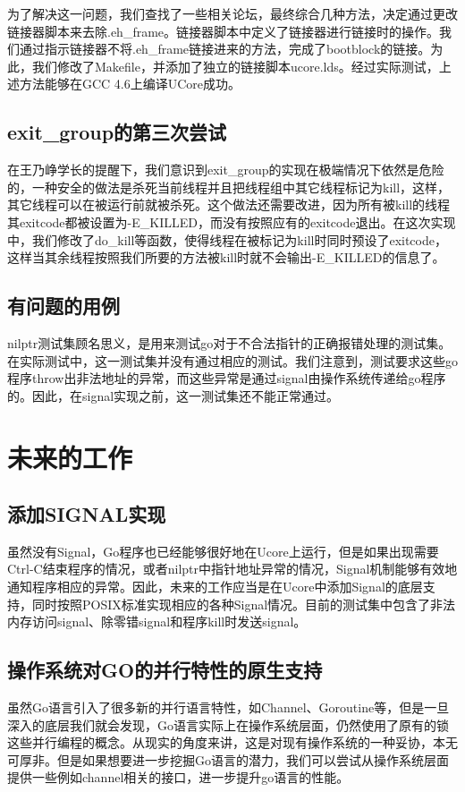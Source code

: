 \documentclass{article}
\begin{document}
为了解决这一问题，我们查找了一些相关论坛，最终综合几种方法，决定通过更改链接器脚本来去除.eh\_frame。链接器脚本中定义了链接器进行链接时的操作。我们通过指示链接器不将.eh\_frame链接进来的方法，完成了bootblock的链接。为此，我们修改了Makefile，并添加了独立的链接脚本ucore.lds。经过实际测试，上述方法能够在GCC 4.6上编译UCore成功。

\subsection{exit\_group的第三次尝试}
在王乃峥学长的提醒下，我们意识到exit\_group的实现在极端情况下依然是危险的，一种安全的做法是杀死当前线程并且把线程组中其它线程标记为kill，这样，其它线程可以在被运行前就被杀死。这个做法还需要改进，因为所有被kill的线程其exitcode都被设置为-E\_KILLED，而没有按照应有的exitcode退出。在这次实现中，我们修改了do\_kill等函数，使得线程在被标记为kill时同时预设了exitcode，这样当其余线程按照我们所要的方法被kill时就不会输出-E\_KILLED的信息了。

\subsection{有问题的用例}
nilptr测试集顾名思义，是用来测试go对于不合法指针的正确报错处理的测试集。在实际测试中，这一测试集并没有通过相应的测试。我们注意到，测试要求这些go程序throw出非法地址的异常，而这些异常是通过signal由操作系统传递给go程序的。因此，在signal实现之前，这一测试集还不能正常通过。

\section{未来的工作}

\subsection{添加SIGNAL实现}
虽然没有Signal，Go程序也已经能够很好地在Ucore上运行，但是如果出现需要Ctrl-C结束程序的情况，或者nilptr中指针地址异常的情况，Signal机制能够有效地通知程序相应的异常。因此，未来的工作应当是在Ucore中添加Signal的底层支持，同时按照POSIX标准实现相应的各种Signal情况。目前的测试集中包含了非法内存访问signal、除零错signal和程序kill时发送signal。

\subsection{操作系统对GO的并行特性的原生支持}
虽然Go语言引入了很多新的并行语言特性，如Channel、Goroutine等，但是一旦深入的底层我们就会发现，Go语言实际上在操作系统层面，仍然使用了原有的锁这些并行编程的概念。从现实的角度来讲，这是对现有操作系统的一种妥协，本无可厚非。但是如果想要进一步挖掘Go语言的潜力，我们可以尝试从操作系统层面提供一些例如channel相关的接口，进一步提升go语言的性能。
\end{document}
